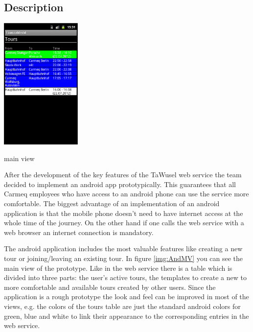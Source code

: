 \subsection{Description}\label{ssec:AndrDes}
\begin{floatingfigure}[r]{5cm}
	\includegraphics[width=4cm]{images/Tawuseldroid_tours.png}
	\caption{main view}
	\label{img:AndMV}
\end{floatingfigure}

\noindent
After the development of the key features of the TaWusel web service the team decided to implement an android app prototypically. This guarantees that all Carmeq employees who have access to an android phone can use the service more comfortable. The biggest advantage of an implementation of an android application is that the mobile phone doesn't need to have internet access at the whole time of the journey. On the other hand if one calls the web service with a web browser an internet connection is mandatory.

\emptyRow
The android application includes the most valuable features like creating a new tour or joining/leaving an existing tour. In figure \ref{img:AndMV} you can see the main view of the prototype. Like in the web service there is a table which is divided into three parts: the user's active tours, the templates to create a new to more comfortable and available tours created by other users. Since the application is a rough prototype the look and feel can be improved in most of the views, e.g. the colors of the tours table are just the standard android colors for green, blue and white to link their appearance to the corresponding entries in the web service.  

